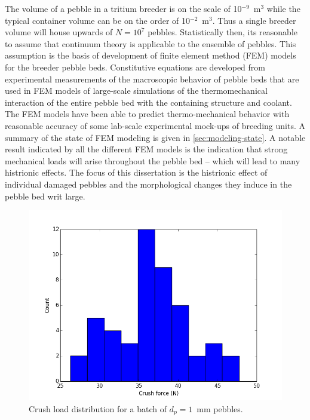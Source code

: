 The volume of a pebble in a tritium breeder is on the scale of 10$^{-9}$~m$^3$ while the typical container volume can be on the order of 10$^{-2}$~m$^3$\cite{Cho2008}.  Thus a single breeder volume will house upwards of $N = 10^7$ pebbles. Statistically then, its reasonable to assume that continuum theory is applicable to the ensemble of pebbles. This assumption is the basis of development of finite element method (FEM) models for the breeder pebble beds. Constitutive equations are developed from experimental measurements of the macroscopic behavior of pebble beds that are used in FEM models of large-scale simulations of the thermomechanical interaction of the entire pebble bed with the containing structure and coolant. The FEM models have been able to predict thermo-mechanical behavior with reasonable accuracy of some lab-scale experimental mock-ups of breeding units.\cite{DiMaio20081287,Zaccari20081282,Gan:2009vn} A summary of the state of FEM modeling is given in \cref{sec:modeling-state}. A notable result indicated by all the different FEM models is the indication that strong mechanical loads will arise throughout the pebble bed -- which will lead to many histrionic effects. The focus of this dissertation is the histrionic effect of individual damaged pebbles and the morphological changes they induce in the pebble bed writ large.

\begin{figure}[ht]
	\centering
	\includegraphics[width=\singleimagewidth]{chapters/figures/fmax} 
	\caption{Crush load distribution for a batch of $d_p = 1$~mm \lit pebbles.}
	\label{fig:fmax}
\end{figure}


